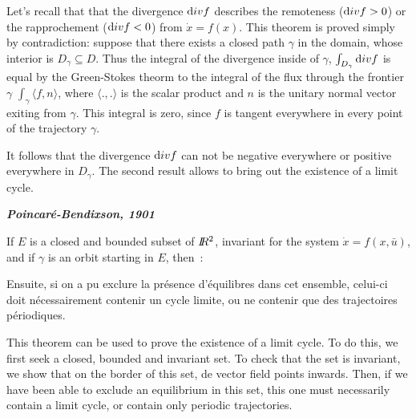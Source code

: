 {Let's recall that that the divergence ${\mbox div}f$ describes the remoteness (${\mbox div}f >0$) or the rapprochement (${\mbox div}f <0$) from $\dot{x}=f(x)$.
This theorem is proved simply by contradiction: suppose that there exists a closed path $\gamma$ in the domain, whose interior is $D_{\gamma} \subseteq D$.
Thus the integral of the divergence inside of $\gamma$, $\int_{D_\gamma}  {\mbox div}f$ is equal by the Green-Stokes theorm to the integral
of the flux through the frontier $\gamma$ $\int_\gamma \langle f, n \rangle$, where $\langle.,.\rangle$
is the scalar product and $n$ is the unitary normal vector exiting from $\gamma$.
This integral is zero, since $f$ is tangent everywhere in every point of the trajectory $\gamma$. 

It follows that the divergence ${\mbox div}f$ can not be negative everywhere or positive everywhere in $D_{\gamma}$.
The second result allows to bring out the existence of a limit cycle.

\begin{theoreme} {\bf \em Poincar{é}-Bendixson, 1901}

If $E$ is a closed and bounded subset of $I \! \! R^2$, invariant for the system $\dot x= f(x,\bar u)$, and if $\gamma$ is an orbit
starting in $E$, then~:

\end{theoreme}


Ensuite, si on a pu exclure la
pr{é}sence d'{é}quilibres dans cet ensemble, celui-ci doit n{é}cessairement contenir un
cycle limite, ou ne contenir que des trajectoires p{é}riodiques.

This theorem can be used to prove the existence of a limit cycle. To do this, we first seek a closed, bounded and invariant set.
To check that the set is invariant, we show that on the border of this set, de vector field points inwards. Then, if we have been 
able to exclude an equilibrium in this set, this one must necessarily contain a limit cycle, or contain only periodic trajectories.

}
